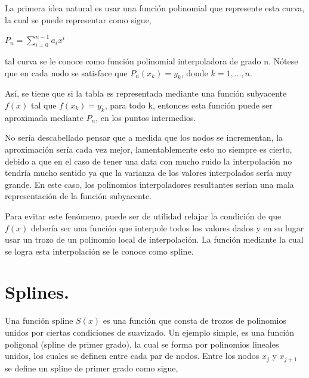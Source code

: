 \hspace{0.4cm} La primera idea natural es usar una funci\'on polinomial que represente esta curva, la cual se puede representar como sigue,

\vspace{0.5cm}
\begin{center}

$\displaystyle{P_{n} = \sum_{i=0}^{n-1} a_{i}x^{i}}$

\end{center}

\vspace{0.2cm}

\noindent tal curva se le conoce como funci\'on polinomial interpoladora de grado n. N\'otese que en cada nodo se satisface que $P_{n}(x_{k})=y_{k}$, donde $k=1,...,n$.


\hspace{0.4cm} As\'i, se tiene que si la tabla es representada mediante una funci\'on subyacente $f(x)$ tal que $f(x_{k})=y_{k}$, para todo k, entonces esta funci\'on puede ser aproximada mediante $P_{n}$, en los puntos intermedios.



\hspace{0.4cm} No ser\'ia descabellado pensar que a medida que los nodos se incrementan, la aproximaci\'on ser\'ia cada vez mejor, lamentablemente esto no siempre es cierto, debido a que en el caso de tener una data con mucho ruido la interpolaci\'on no tendr\'ia mucho sentido ya que la varianza de los valores interpolados ser\'ia muy grande. En este caso, los polinomios interpoladores resultantes ser\'ian una mala representaci\'on de la funci\'on subyacente.


\hspace{0.4cm} Para evitar este fen\'omeno, puede ser de utilidad relajar la condici\'on de que $f(x)$ deber\'ia ser una funci\'on que interpole todos los valores dados y en su lugar usar un trozo de un polinomio local de interpolaci\'on. La funci\'on mediante la cual se logra esta interpolaci\'on se le conoce como spline.


\section{Splines.}


\hspace{0.4cm} Una funci\'on spline $S(x)$ es una funci\'on que consta de trozos de polinomios unidos por ciertas condiciones de suavizado. Un ejemplo simple, es una funci\'on poligonal (spline de primer grado), la cual se forma por polinomios lineales unidos, los cuales se definen entre cada par de nodos. Entre los nodos $x_{j}$ y $x_{j+1}$ se define un spline de primer grado como sigue, \\


